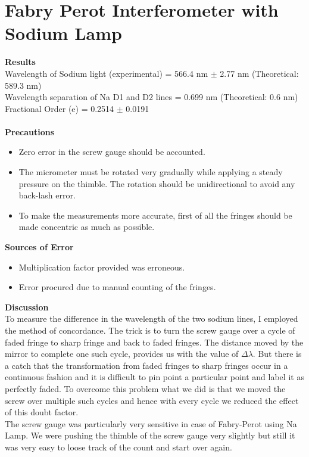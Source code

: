\documentclass[12pt]{report}
\begin{document}
	\newpage
	\section{Fabry Perot Interferometer with Sodium Lamp}
	\textbf{Results}\\
	Wavelength of Sodium light (experimental) = 566.4 nm $\pm$ 2.77 nm (Theoretical: 589.3 nm)\\
	Wavelength separation of Na D1 and D2 lines = 0.699 nm (Theoretical: 0.6 nm)\\
	Fractional Order (e) = 0.2514 $\pm$ 0.0191\\ \\
	\textbf{Precautions}
	\begin{itemize}
		\item Zero error in the screw gauge should be accounted.
		\item The micrometer must be rotated very gradually while applying a steady pressure
		on the thimble. The rotation should be unidirectional to avoid any back-lash error.
		\item To make the measurements more accurate, first of all the fringes should be made
		concentric as much as possible.
	\end{itemize}
	\textbf{Sources of Error}
	\begin{itemize}
		\item Multiplication factor provided was erroneous. 
		\item Error procured due to manual counting of the fringes. 
	\end{itemize}
	\textbf{Discussion}\\
	To measure the difference in the wavelength of the two sodium lines, I employed the method of concordance. The trick is to turn the screw gauge over a cycle of faded fringe to sharp fringe and back to faded fringes. The distance moved by the mirror to complete one such cycle, provides us with the value of $\Delta\lambda$. But there is a catch that the transformation from faded fringes to sharp fringes occur in a continuous fashion and it is difficult to pin point a particular point and label it as perfectly faded. To overcome this problem what we did is that we moved the screw over multiple such cycles and hence with every cycle we reduced the effect of this doubt factor.\\
	The screw gauge was particularly very sensitive in case of Fabry-Perot using Na Lamp. We were pushing the thimble of the screw gauge very slightly but still it was very easy to loose track of the count and start over again.  
	\newpage
\end{document}
